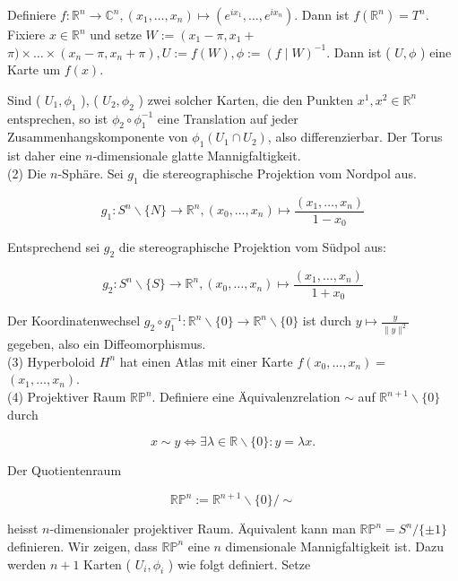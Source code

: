 \documentclass[10pt, letterpaper]{article}
\begin{document}
Definiere $f: \mathbb{R}^{n} \rightarrow \mathbb{C}^{n},\left(x_{1}, \ldots, x_{n}\right) \mapsto\left(e^{i x_{1}}, \ldots, e^{i x_{n}}\right)$. Dann ist $f\left(\mathbb{R}^{n}\right)=T^{n}$. Fixiere $x \in \mathbb{R}^{n}$ und setze $W:=\left(x_{1}-\pi, x_{1}+\right.$ $\pi) \times \ldots \times\left(x_{n}-\pi, x_{n}+\pi\right), U:=f(W), \phi:=(f \mid W)^{-1}$. Dann ist ( $U, \phi$ ) eine Karte um $f(x)$.

Sind ( $U_{1}, \phi_{1}$ ), ( $U_{2}, \phi_{2}$ ) zwei solcher Karten, die den Punkten $x^{1}, x^{2} \in \mathbb{R}^{n}$ entsprechen, so ist $\phi_{2} \circ \phi_{1}^{-1}$ eine Translation auf jeder Zusammenhangskomponente von $\phi_{1}\left(U_{1} \cap U_{2}\right)$, also differenzierbar. Der Torus ist daher eine $n$-dimensionale glatte Mannigfaltigkeit.\\
(2) Die $n$-Sphäre. Sei $g_{1}$ die stereographische Projektion vom Nordpol aus.

$$
g_{1}: S^{n} \backslash\{N\} \rightarrow \mathbb{R}^{n},\left(x_{0}, \ldots, x_{n}\right) \mapsto \frac{\left(x_{1}, \ldots, x_{n}\right)}{1-x_{0}}
$$

Entsprechend sei $g_{2}$ die stereographische Projektion vom Südpol aus:

$$
g_{2}: S^{n} \backslash\{S\} \rightarrow \mathbb{R}^{n},\left(x_{0}, \ldots, x_{n}\right) \mapsto \frac{\left(x_{1}, \ldots, x_{n}\right)}{1+x_{0}}
$$

Der Koordinatenwechsel $g_{2} \circ g_{1}^{-1}: \mathbb{R}^{n} \backslash\{0\} \rightarrow \mathbb{R}^{n} \backslash\{0\}$ ist durch $y \mapsto \frac{y}{\|y\|^{2}}$ gegeben, also ein Diffeomorphismus.\\
(3) Hyperboloid $H^{n}$ hat einen Atlas mit einer Karte $f\left(x_{0}, \ldots, x_{n}\right)=$ $\left(x_{1}, \ldots, x_{n}\right)$.\\
(4) Projektiver Raum $\mathbb{R P}^{n}$. Definiere eine Äquivalenzrelation $\sim$ auf $\mathbb{R}^{n+1} \backslash\{0\}$ durch

$$
x \sim y \Longleftrightarrow \exists \lambda \in \mathbb{R} \backslash\{0\}: y=\lambda x .
$$

Der Quotientenraum

$$
\mathbb{R P}^{n}:=\mathbb{R}^{n+1} \backslash\{0\} / \sim
$$

heisst $n$-dimensionaler projektiver Raum. Äquivalent kann man $\mathbb{R} \mathbb{P}^{n}=S^{n} /\{ \pm 1\}$ definieren. Wir zeigen, dass $\mathbb{R} \mathbb{P}^{n}$ eine $n$ dimensionale Mannigfaltigkeit ist. Dazu werden $n+1$ Karten ( $U_{i}, \phi_{i}$ ) wie folgt definiert. Setze
\end{document}

